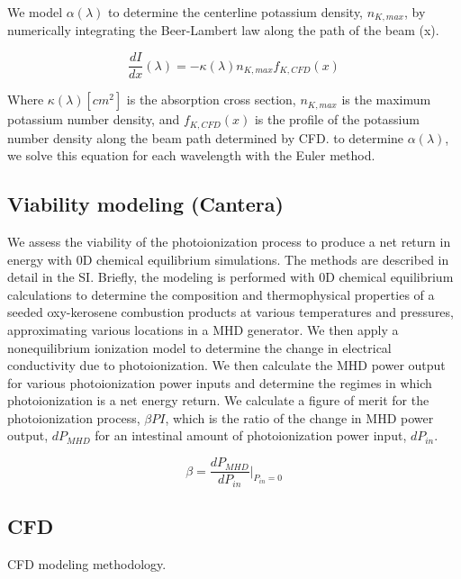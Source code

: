 We model $\alpha(\lambda)$ to determine the centerline potassium density, $n_{K, max}$, by numerically integrating the Beer-Lambert law along the path of the beam (x).

\begin{equation}
    \frac{dI}{dx}(\lambda) = -\kappa(\lambda) n_{K,max} f_{K, CFD}(x)
\end{equation}

Where $\kappa(\lambda) [cm^2]$ is the absorption cross section, $n_{K,max}$ is the maximum potassium number density, and $f_{K, CFD}(x)$ is the profile of the potassium number density along the beam path determined by CFD. to determine $\alpha(\lambda)$, we solve this equation for each wavelength with the Euler method.  


\subsection{Viability modeling (Cantera)}

We assess the viability of the photoionization process to produce a net return in energy with 0D chemical equilibrium simulations. The methods are described in detail in the SI. Briefly, the modeling is performed with 0D chemical equilibrium calculations to determine the composition and thermophysical properties of a seeded oxy-kerosene combustion products at various temperatures and pressures, approximating various locations in a MHD generator. We then apply a nonequilibrium ionization model to determine the change in electrical conductivity due to photoionization. We then calculate the MHD power output for various photoionization power inputs and determine the regimes in which photoionization is a net energy return. We calculate a figure of merit for the photoionization process, $\beta{PI}$, which is the ratio of the change in MHD power output, $dP_{MHD}$ for an intestinal amount of photoionization power input, $dP_{in}$. 


\begin{equation}
\beta = \frac{dP_{MHD}}{dP_{in}} \Big|_{P_{in}=0}
\end{equation}

\subsection{CFD}

CFD modeling methodology. 


